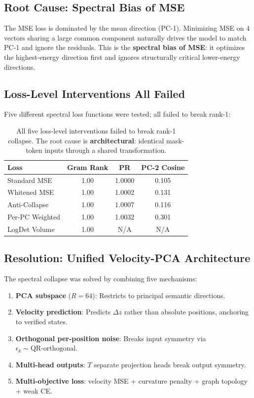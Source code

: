 \documentclass[11pt,a4paper]{article}
\begin{document}
\subsection{Root Cause: Spectral Bias of MSE}
The MSE loss is dominated by the mean direction (PC-1).
Minimizing MSE on 4 vectors sharing a large common component naturally drives the model to match PC-1 and ignore the residuals.
This is the \textbf{spectral bias of MSE}: it optimizes the highest-energy direction first and ignores structurally critical lower-energy directions.

\subsection{Loss-Level Interventions All Failed}

Five different spectral loss functions were tested; all failed to break rank-1:

\begin{table}[H]
\centering
\small
\begin{tabular}{@{}lccc@{}}
\toprule
\textbf{Loss} & \textbf{Gram Rank} & \textbf{PR} & \textbf{PC-2 Cosine} \\
\midrule
Standard MSE & 1.00 & 1.0000 & 0.105 \\
Whitened MSE & 1.00 & 1.0002 & 0.131 \\
Anti-Collapse & 1.00 & 1.0007 & 0.116 \\
Per-PC Weighted & 1.00 & 1.0032 & 0.301 \\
LogDet Volume & 1.00 & N/A & N/A \\
\bottomrule
\end{tabular}
\caption{All five loss-level interventions failed to break rank-1 collapse.
The root cause is \textbf{architectural}: identical mask-token inputs through a shared transformation.}
\label{tab:lossfail}
\end{table}

\subsection{Resolution: Unified Velocity-PCA Architecture}

The spectral collapse was solved by combining five mechanisms:

\begin{enumerate}[leftmargin=*,itemsep=2pt]
    \item \textbf{PCA subspace} ($R\!=\!64$): Restricts to principal semantic directions.
    \item \textbf{Velocity prediction}: Predicts $\Delta z$ rather than absolute positions, anchoring to verified states.
    \item \textbf{Orthogonal per-position noise}: Breaks input symmetry via $\epsilon_k \sim \text{QR-orthogonal}$.
    \item \textbf{Multi-head outputs}: $T$ separate projection heads break output symmetry.
    \item \textbf{Multi-objective loss}: velocity MSE + curvature penalty + graph topology + weak CE.
\end{enumerate}
\end{document}
